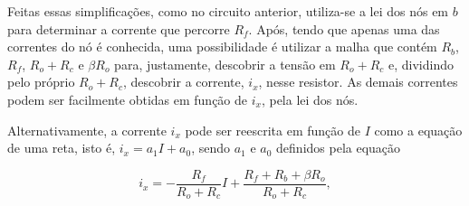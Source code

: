\documentclass{article}
\numberwithin{equation}{section}
\newlength\Colsep
\let\dfr\dfrac
\begin{document}
\noindent\begin{minipage}{0.96\textwidth}
\begin{minipage}[c][8cm][c]{\dimexpr0.63\textwidth-0.5\Colsep\relax}
    \begin{center}
    \end{center}
\end{minipage} \hfill
\begin{minipage}[c][7cm][c]{\dimexpr0.37\textwidth-0.5\Colsep\relax}
    Feitas essas simplificações, como no circuito anterior, utiliza-se a lei dos nós em $b$ para determinar a corrente que percorre $R_{f}$. Após, tendo que apenas uma das correntes do nó é conhecida, uma possibilidade é utilizar a malha que contém $R_{b}$, $R_{f}$, $R_o + R_c$ e $\beta R_o$ para, justamente, descobrir a tensão em $R_o + R_c$ e, dividindo pelo próprio $R_o + R_c$, descobrir a corrente, $i_x$, nesse resistor. As demais correntes podem ser facilmente obtidas em função de $i_x$, pela lei dos nós.
\end{minipage}
\end{minipage}

\vspace{5mm}
\noindent Alternativamente, a corrente $i_x$ pode ser reescrita em função de $I$ como a equação de uma reta, isto é, $i_x = a_1I + a_0$, sendo $a_1$ e $a_0$ definidos pela equação

\begin{equation}
    i_x=-\dfr{R_{f}}{R_o+R_c}I + \dfr{R_{f}+R_b+\beta R_o}{R_o+R_c}, \label{eq:ix_Rth_fonte_arbitraria}
\end{equation}
\end{document}

